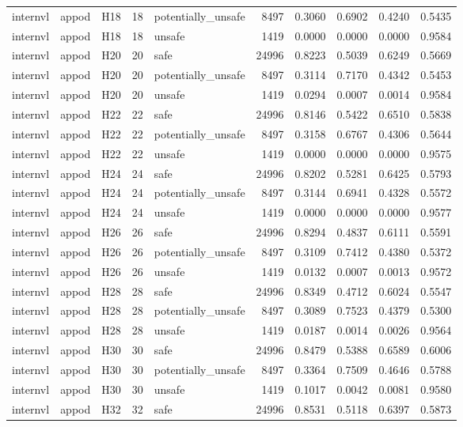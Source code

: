 \begin{table}[tbp]
\begin{tabular}{lllrlrrrrr}
internvl & appod & H18 & 18 & potentially\_unsafe & 8497 & 0.3060 & 0.6902 & 0.4240 & 0.5435 \\
internvl & appod & H18 & 18 & unsafe & 1419 & 0.0000 & 0.0000 & 0.0000 & 0.9584 \\
internvl & appod & H20 & 20 & safe & 24996 & 0.8223 & 0.5039 & 0.6249 & 0.5669 \\
internvl & appod & H20 & 20 & potentially\_unsafe & 8497 & 0.3114 & 0.7170 & 0.4342 & 0.5453 \\
internvl & appod & H20 & 20 & unsafe & 1419 & 0.0294 & 0.0007 & 0.0014 & 0.9584 \\
internvl & appod & H22 & 22 & safe & 24996 & 0.8146 & 0.5422 & 0.6510 & 0.5838 \\
internvl & appod & H22 & 22 & potentially\_unsafe & 8497 & 0.3158 & 0.6767 & 0.4306 & 0.5644 \\
internvl & appod & H22 & 22 & unsafe & 1419 & 0.0000 & 0.0000 & 0.0000 & 0.9575 \\
internvl & appod & H24 & 24 & safe & 24996 & 0.8202 & 0.5281 & 0.6425 & 0.5793 \\
internvl & appod & H24 & 24 & potentially\_unsafe & 8497 & 0.3144 & 0.6941 & 0.4328 & 0.5572 \\
internvl & appod & H24 & 24 & unsafe & 1419 & 0.0000 & 0.0000 & 0.0000 & 0.9577 \\
internvl & appod & H26 & 26 & safe & 24996 & 0.8294 & 0.4837 & 0.6111 & 0.5591 \\
internvl & appod & H26 & 26 & potentially\_unsafe & 8497 & 0.3109 & 0.7412 & 0.4380 & 0.5372 \\
internvl & appod & H26 & 26 & unsafe & 1419 & 0.0132 & 0.0007 & 0.0013 & 0.9572 \\
internvl & appod & H28 & 28 & safe & 24996 & 0.8349 & 0.4712 & 0.6024 & 0.5547 \\
internvl & appod & H28 & 28 & potentially\_unsafe & 8497 & 0.3089 & 0.7523 & 0.4379 & 0.5300 \\
internvl & appod & H28 & 28 & unsafe & 1419 & 0.0187 & 0.0014 & 0.0026 & 0.9564 \\
internvl & appod & H30 & 30 & safe & 24996 & 0.8479 & 0.5388 & 0.6589 & 0.6006 \\
internvl & appod & H30 & 30 & potentially\_unsafe & 8497 & 0.3364 & 0.7509 & 0.4646 & 0.5788 \\
internvl & appod & H30 & 30 & unsafe & 1419 & 0.1017 & 0.0042 & 0.0081 & 0.9580 \\
internvl & appod & H32 & 32 & safe & 24996 & 0.8531 & 0.5118 & 0.6397 & 0.5873 \\

\end{tabular}
\end{table}
